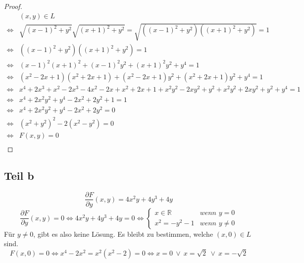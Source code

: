 \documentclass[10pt,a4paper]{article}
\begin{document}
\begin{proof}
\begin{align*}
& (x, y) \in L\\
\Leftrightarrow & \sqrt{(x - 1)^{2} + y^{2}}\sqrt{(x + 1)^{2} + y^{2}} = \sqrt{((x - 1)^{2} + y^{2})((x + 1)^{2} + y^{2})} = 1\\
\Leftrightarrow & ((x - 1)^{2} + y^{2})((x + 1)^{2} + y^{2}) = 1\\
\Leftrightarrow & (x - 1)^{2}(x + 1)^{2} + (x - 1)^{2}y^{2} + (x + 1)^{2}y^{2} + y^{4} = 1\\
\Leftrightarrow & (x^{2} - 2x + 1)(x^{2} + 2x + 1) + (x^{2} - 2x + 1)y^{2} + (x^{2} + 2x + 1)y^{2} + y^{4} = 1\\
\Leftrightarrow & x^{4} + 2x^{3} + x^{2} - 2x^{3} - 4x^{2} - 2x + x^{2} + 2x + 1 + x^{2}y^{2} - 2xy^{2} + y^{2} + x^{2}y^{2} + 2xy^{2} + y^{2} + y^{4} = 1\\
\Leftrightarrow & x^{4} + 2x^{2}y^{2} + y^{4} - 2x^{2} + 2y^{2} + 1 = 1\\
\Leftrightarrow & x^{4} + 2x^{2}y^{2} + y^{4} - 2x^{2} + 2y^{2} = 0\\
\Leftrightarrow & (x^{2} + y^{2})^{2} - 2(x^{2} - y^{2}) = 0\\
\Leftrightarrow & F(x, y) = 0\\
\end{align*}
\end{proof}

\subsection*{Teil b}

\begin{equation}
\frac{\partial F}{\partial y}(x, y) = 4x^{2}y + 4y^{3} + 4y
\end{equation}
\begin{equation}
\frac{\partial F}{\partial y}(x, y) = 0 \Leftrightarrow 4x^{2}y + 4y^{3} + 4y = 0 \Leftrightarrow \begin{cases}
x \in \mathbb{R} & \textit{wenn $y = 0$}\\
x^{2} = - y^{2} - 1& \textit{wenn $y \ne 0$}
\end{cases}
\end{equation}
Für $y \ne 0$, gibt es also keine Lösung.
Es bleibt zu bestimmen, welche $(x, 0) \in L$ sind.
\begin{equation}
F(x, 0) = 0 \Leftrightarrow x^{4} - 2x^{2} = x^{2}(x^{2} - 2) = 0 \Leftrightarrow x = 0\ \lor\ x = \sqrt{2}\ \lor\ x = -\sqrt{2}
\end{equation}
\end{document}
